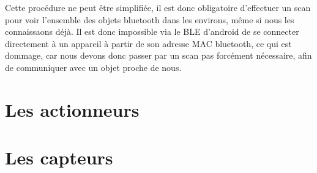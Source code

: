 Cette procédure ne peut être simplifiée, il est donc obligatoire d'effectuer un scan pour voir l'ensemble des 
objets bluetooth dans les environs, même si nous les connaissaons déjà. Il est donc impossible via le BLE 
d'android de se connecter directement à un appareil à partir de son adresse MAC bluetooth, ce qui est 
dommage, car nous devons donc passer par un scan pas forcément nécessaire, afin de communiquer avec un objet 
proche de nous.




\section{Les actionneurs}
\section{Les capteurs}


